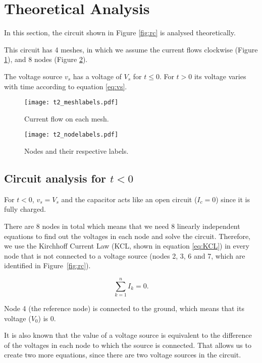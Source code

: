 \section{Theoretical Analysis}
\label{sec:analysis}
\indent

In this section, the circuit shown in Figure \ref{fig:rc} is analysed theoretically.

This circuit has 4 meshes, in which we assume the current flows clockwise (Figure \ref{fig:mesh}), and 8 nodes (Figure \ref{fig:Nodes}).

The voltage source $v_s$ has a voltage of $V_s$ for $t\leq0$.
For $t>0$ its voltage varies with time according to equation \ref{eq:vs}.

\begin{figure}[H] \centering
    \texttt{[image: t2\_meshlabels.pdf]}
    \caption{Current flow on each mesh.}
    \label{fig:mesh}
\end{figure}

\begin{figure}[H] \centering
    \texttt{[image: t2\_nodelabels.pdf]}
    \caption{Nodes and their respective labels.}
    \label{fig:Nodes}
\end{figure}




\subsection{Circuit analysis for $t<0$}
\label{subsection:circ_analysis}

\indent

For $t<0$, $v_s=V_s$ and the capacitor acts like an open circuit ($I_c=0$) since it is fully charged. 

There are 8 nodes in total which means that we need 8 linearly independent equations to find out the voltages in each node and solve the circuit. Therefore, we use the Kirchhoff Current Law (KCL, shown in equation \ref{eq:KCL}) in every node that is not connected to a voltage source (nodes 2, 3, 6 and 7, which are identified in Figure~\ref{fig:rc}).

\begin{equation}
    \sum_{k=1}^{n} I_k = 0.
    \label{eq:KCL}
\end{equation}

Node 4 (the reference node) is connected to the ground, which means that its voltage ($V_0$) is 0. 

It is also known that the value of a voltage source is equivalent to the difference of the voltages in each node to which the source is connected. That allows us to create two more equations, since there are two voltage sources in the circuit.

